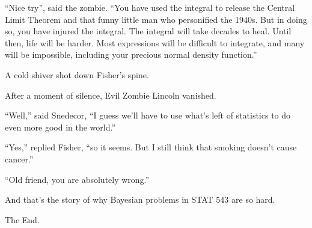\documentclass{article}
\begin{document}
``Nice try'', said the zombie. ``You have used the integral to release the Central Limit Theorem and that funny little man who personified the 1940s. But in doing so, you have injured the integral. The integral will take decades to heal. Until then, life will be harder. Most expressions will be difficult to integrate, and many will be impossible, including your precious normal density function.''

A cold shiver shot down Fisher's spine. 

After a moment of silence, Evil Zombie Lincoln vanished. 

``Well,'' said Snedecor, ``I guess we'll have to use what's left of statistics to do even more good in the world.'' 

``Yes,'' replied Fisher, ``so it seems. But I still think that smoking doesn't cause cancer.'' 

``Old friend, you are absolutely wrong.'' 

And that's the story of why Bayesian problems in STAT 543 are so hard. 

\begin{center}
The End.
\end{center}
\end{document}
